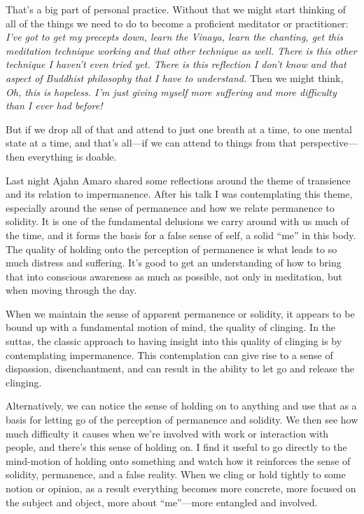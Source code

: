 That's a big part of personal practice. Without that we might start 
thinking of all of the things we need to do to become a proficient 
meditator or practitioner: \emph{I've got to get my precepts down, 
learn the Vinaya, learn the chanting, get this meditation technique 
working and that other technique as well. There is this other technique 
I haven't even tried yet. There is this reflection I don't know and 
that aspect of Buddhist philosophy that I have to understand.} Then we 
might think, \emph{Oh, this is hopeless. I'm just giving myself more 
suffering and more difficulty than I ever had before!}

But if we drop all of that and attend to just one breath at a time, to 
one mental state at a time, and that's all---if we can attend to things 
from that perspective---then everything is doable.


Last night Ajahn Amaro shared some reflections around the theme of 
transience and its relation to impermanence. After his talk I was 
contemplating this theme, especially around the sense of permanence and 
how we relate permanence to solidity. It is one of the fundamental 
delusions we carry around with us much of the time, and it forms the 
basis for a false sense of self, a solid ``me'' in this body. The 
quality of holding onto the perception of permanence is what leads to 
so much distress and suffering. It's good to get an understanding of 
how to bring that into conscious awareness as much as possible, not 
only in meditation, but when moving through the day.

When we maintain the sense of apparent permanence or solidity, it 
appears to be bound up with a fundamental motion of mind, the quality 
of clinging. In the suttas, the classic approach to having insight into 
this quality of clinging is by contemplating impermanence. This 
contemplation can give rise to a sense of dispassion, disenchantment, 
and can result in the ability to let go and release the clinging.

Alternatively, we can notice the sense of holding on to anything and 
use that as a basis for letting go of the perception of permanence and 
solidity. We then see how much difficulty it causes when we're involved 
with work or interaction with people, and there's this sense of holding 
on. I find it useful to go directly to the mind-motion of holding onto 
something and watch how it reinforces the sense of solidity, 
permanence, and a false reality. When we cling or hold tightly to some 
notion or opinion, as a result everything becomes more concrete, more 
focused on the subject and object, more about ``me''---more entangled 
and involved.

